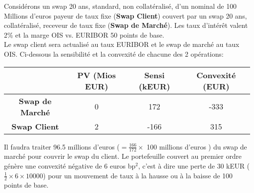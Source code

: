 \documentclass{article}
\begin{document}
Considérons un swap 20 ans, standard, non collatéralisé, d'un nominal de 100 Millions d'euros payeur de taux fixe (\textbf{Swap Client}) couvert par un swap 20 ans, collatéralisé, receveur de taux fixe (\textbf{Swap de Marché}). Les taux d'intérêt valent 2\% et la marge OIS vs. EURIBOR 50 points de base.\\

Le swap client sera actualisé au taux EURIBOR et le swap de marché au taux OIS. Ci-dessous la sensibilité et la convexité de chacune des 2 opérations:
\begin{center}
\begin{tabular}{|c|c|c|c|}
\hline
&\textbf{PV (Mios EUR)}&\textbf{Sensi (kEUR)}& \textbf{Convexité (EUR)}  \\ 
\hline
\textbf{Swap de Marché} & 0&172&-333 \\ 
\hline
\textbf{Swap Client} & 2&-166&315 \\ 
\hline
\end{tabular}
\end{center}

Il faudra traiter 96.5 millions d'euros ($=\frac{166}{172} \times $ 100 millions d'euros ) du swap de marché pour couvrir le swap du client. Le portefeuille couvert au premier ordre génère une convexité négative de 6 euros bp$^2$, c'est à dire une perte de 30 kEUR ($\frac{1}{2} \times 6 \times 10000 $) pour un mouvement de taux à la hausse ou à la baisse de 100 points de base.    
  
\end{document}
